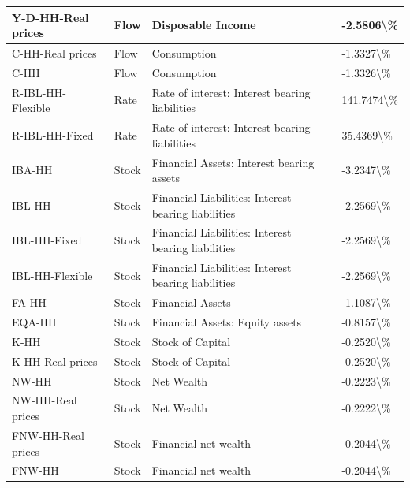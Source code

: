 \documentclass[
]{book}
\begin{document}
\begin{table}
\begin{tabular}[t]{l|l|l|l}
\hline
Y-D-HH-Real prices & Flow & Disposable Income & -2.5806\textbackslash{}\%\\
\hline
C-HH-Real prices & Flow & Consumption & -1.3327\textbackslash{}\%\\
\hline
C-HH & Flow & Consumption & -1.3326\textbackslash{}\%\\
\hline
R-IBL-HH-Flexible & Rate & Rate of interest: Interest bearing liabilities & 141.7474\textbackslash{}\%\\
\hline
R-IBL-HH-Fixed & Rate & Rate of interest: Interest bearing liabilities & 35.4369\textbackslash{}\%\\
\hline
IBA-HH & Stock & Financial Assets: Interest bearing assets & -3.2347\textbackslash{}\%\\
\hline
IBL-HH & Stock & Financial Liabilities: Interest bearing liabilities & -2.2569\textbackslash{}\%\\
\hline
IBL-HH-Fixed & Stock & Financial Liabilities: Interest bearing liabilities & -2.2569\textbackslash{}\%\\
\hline
IBL-HH-Flexible & Stock & Financial Liabilities: Interest bearing liabilities & -2.2569\textbackslash{}\%\\
\hline
FA-HH & Stock & Financial Assets & -1.1087\textbackslash{}\%\\
\hline
EQA-HH & Stock & Financial Assets: Equity assets & -0.8157\textbackslash{}\%\\
\hline
K-HH & Stock & Stock of Capital & -0.2520\textbackslash{}\%\\
\hline
K-HH-Real prices & Stock & Stock of Capital & -0.2520\textbackslash{}\%\\
\hline
NW-HH & Stock & Net Wealth & -0.2223\textbackslash{}\%\\
\hline
NW-HH-Real prices & Stock & Net Wealth & -0.2222\textbackslash{}\%\\
\hline
FNW-HH-Real prices & Stock & Financial net wealth & -0.2044\textbackslash{}\%\\
\hline
FNW-HH & Stock & Financial net wealth & -0.2044\textbackslash{}\%\\
\hline
\end{tabular}
\end{table}
\end{document}
